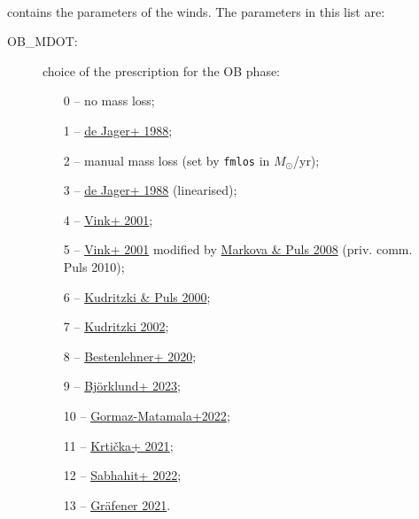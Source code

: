 \documentclass[11pt]{article}
\def\msol{\ensuremath{M_\odot}}
\begin{document}
\begin{description}
  \item[] ~\\ contains the parameters of the winds. The parameters in this list are:
    \begin{description}
      \item[OB\_MDOT:] choice of the prescription for the OB phase:
         \begin{enumerate}[labelindent=.5cm,font=\ttfamily \bfseries,label=\arabic*]
           \item[0] -- no mass loss;
           \item[1] -- \href{https://ui.adsabs.harvard.edu/abs/1988A&AS...72..259D}{de Jager+ 1988};
           \item[2] -- manual mass loss (set by \texttt{fmlos} in \msol/yr);
           \item[3] -- \href{https://ui.adsabs.harvard.edu/abs/1988A&AS...72..259D}{de Jager+ 1988} (linearised);
           \item[4] -- \href{https://ui.adsabs.harvard.edu/abs/2001A&A...369..574V}{Vink+ 2001};
           \item[5] -- \href{https://ui.adsabs.harvard.edu/abs/2001A&A...369..574V}{Vink+ 2001} modified by \href{https://ui.adsabs.harvard.edu/abs/2008A&A...478..823M}{Markova \& Puls 2008} (priv. comm. Puls 2010);
           \item[6] -- \href{https://ui.adsabs.harvard.edu/abs/2000ARA&A..38..613K}{Kudritzki \& Puls 2000};
           \item[7] -- \href{https://ui.adsabs.harvard.edu/abs/2002ApJ...577..389K}{Kudritzki 2002};
           \item[8] -- \href{https://ui.adsabs.harvard.edu/abs/2020MNRAS.493.3938B}{Bestenlehner+ 2020};
           \item[9] -- \href{https://ui.adsabs.harvard.edu/abs/2023A&A...676A.109B}{Bj\"orklund+ 2023};
           \item[10] -- \href{https://ui.adsabs.harvard.edu/abs/2022A&A...665A.133G}{Gormaz-Matamala+2022};
           \item[11] -- \href{https://ui.adsabs.harvard.edu/abs/2021A&A...647A..28K}{Krti\v cka+ 2021};
           \item[12] -- \href{https://ui.adsabs.harvard.edu/abs/2022MNRAS.514.3736S}{Sabhahit+ 2022};
           \item[13] -- \href{https://ui.adsabs.harvard.edu/abs/2021A&A...647A..13G}{Gr\"afener 2021}.
         \end{enumerate}

\end{description}
\end{description}
\end{document}
